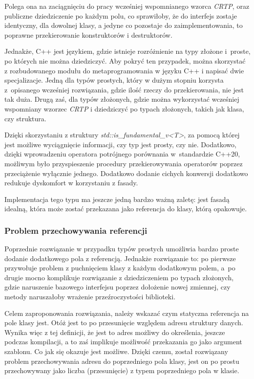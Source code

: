\documentclass[12pt]{article}
\newcommand{\n}{\newline}
\begin{document}
{{{				Polega ona na zaciągnięciu do pracy wcześniej wspomnianego wzorca {\it CRTP}, oraz publiczne dziedziczenie po każdym polu, co sprawiłoby, że
				do interfejs zostaje identyczny, dla dowolnej klasy, a jedyne co pozostaje do zaimplementowania, to poprawne przekierowanie konstruktorów
				i destruktorów.\n

				Jednakże, C++ jest językiem, gdzie istnieje rozróżnienie na typy złożone i~proste, po których nie można dziedziczyć. Aby pokryć ten przypadek,
				można skorzystać z rozbudowanego modułu do metaprogramowania w języku C++ i napisać dwie specjalizacje. Jedną dla typów prostych, który
				w dużym stopniu korzysta z~opisanego wcześniej rozwiązania, gdzie ilość rzeczy do przekierowania, nie jest tak duża. Drugą zaś,
				dla typów złożonych, gdzie można wykorzystać wcześniej wspomniany wzorzec {\it CRTP} i dziedziczyć po typach złożonych, takich jak klasa, czy struktura.\n

				Dzięki skorzystaniu z struktury {\it std::is\_fundamental\_v<T>}\cite{std_is_fundamental}, za pomocą której jest możliwe wyciągnięcie informacji,
				czy typ jest prosty, czy nie. Dodatkowo, dzięki wprowadzeniu operatora potrójnego porównania\cite{starship_operator} w~standardzie C++20, możliwym było
				przyspieszenie procedury przekierowywania operatorów poprzez przeciążenie wyłącznie jednego. Dodatkowo dodanie cichych konwersji dodatkowo redukuje
				dyskomfort w korzystaniu z fasady.\n

				Implementacja tego typu ma jeszcze jedną bardzo ważną zaletę: jest fasadą idealną, która może zostać przekazana jako referencja
				do klasy, którą opakowuje.
			}

			{
				\subsubsection{Problem przechowywania referencji}

				Poprzednie rozwiązanie w przypadku typów prostych umożliwia bardzo proste dodanie dodatkowego pola z referencją. Jednakże rozwiązanie to:
				po pierwsze przywołuje problem z puchnięciem klasy z każdym dodatkowym polem, a~po drugie mocno komplikuje rozwiązanie z dziedziczeniem po
				typach złożonych, gdzie naruszenie bazowego interfejsu poprzez dołożenie nowej zmiennej, czy metody naruszałoby wrażenie przeźroczystości
				biblioteki.

				Celem zaproponowania rozwiązania, należy wskazać czym statyczna referencja na pole klasy jest. Otóż jest to po przesunięcie względem
				adresu struktury danych. Wynika więc z tej definicji, że jest to adres możliwy do określenia, jeszcze podczas kompilacji,
				a to zaś implikuje możliwość przekazania go jako argument szablonu. Co jak się okazuje jest możliwe. Dzięki czemu, został rozwiązany problem
				przechowywania adresu do poprzedniego pola klasy, jest on po prostu przechowywany jako liczba (przesunięcie) z typem poprzedniego pola w klasie.

}}}
\end{document}
